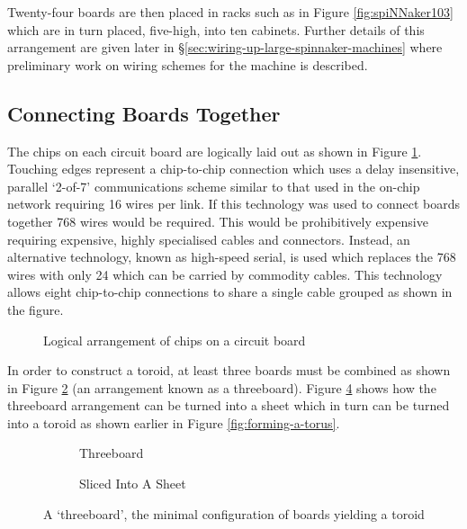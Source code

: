 			Twenty-four boards are then placed in racks such as in Figure
			\ref{fig:spiNNaker103} which are in turn placed, five-high, into ten
			cabinets. Further details of this arrangement are given later in
			\S\ref{sec:wiring-up-large-spinnaker-machines} where preliminary work on
			wiring schemes for the machine is described.
		
		\subsection{Connecting Boards Together}
			
			
			The chips on each circuit board are logically laid out as shown in Figure
			\ref{fig:chipsOnBoard}. Touching edges represent a chip-to-chip connection
			which uses a delay insensitive, parallel `2-of-7' communications scheme
			similar to that used in the on-chip network requiring 16 wires per link.
			If this technology was used to connect boards together 768 wires would be
			required.  This would be prohibitively expensive requiring expensive,
			highly specialised cables and connectors. Instead, an alternative
			technology, known as high-speed serial, is used which replaces the 768
			wires with only 24 which can be carried by commodity cables. This
			technology allows eight chip-to-chip connections to share a single cable
			grouped as shown in the figure.
			
			\begin{figure}
				\center
				
				\caption{Logical arrangement of chips on a circuit board}
				\label{fig:chipsOnBoard}
			\end{figure}
			
			In order to construct a toroid, at least three boards must be combined as
			shown in Figure \ref{fig:threeboard} (an arrangement known as a
			threeboard).  Figure \ref{fig:threeboardSliced} shows how the threeboard
			arrangement can be turned into a sheet which in turn can be turned into a
			toroid as shown earlier in Figure \ref{fig:forming-a-torus}.
			
			\begin{figure}
				\begin{subfigure}[b]{0.45\textwidth}
					\center
					
					\caption{Threeboard}
					\label{fig:threeboard}
				\end{subfigure}
				\begin{subfigure}[b]{0.45\textwidth}
					\center
					
					\caption{Sliced Into A Sheet}
					\label{fig:threeboardSliced}
				\end{subfigure}
				
				\caption[A `threeboard']{A `threeboard', the minimal configuration of
				boards yielding a toroid}
			\end{figure}
			
